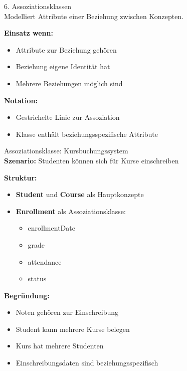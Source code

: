 \begin{concept}{6. Assoziationsklassen}\\
Modelliert Attribute einer Beziehung zwischen Konzepten.

\textbf{Einsatz wenn:}
\begin{itemize}
    \item Attribute zur Beziehung gehören
    \item Beziehung eigene Identität hat
    \item Mehrere Beziehungen möglich sind
\end{itemize}

\textbf{Notation:}
\begin{itemize}
    \item Gestrichelte Linie zur Assoziation
    \item Klasse enthält beziehungsspezifische Attribute
\end{itemize}
\end{concept}

\begin{example2}{Assoziationsklasse: Kursbuchungssystem}\\
\textbf{Szenario:} Studenten können sich für Kurse einschreiben

\textbf{Struktur:}
\begin{itemize}
    \item \textbf{Student} und \textbf{Course} als Hauptkonzepte
    \item \textbf{Enrollment} als Assoziationsklasse:
    \begin{itemize}
        \item enrollmentDate
        \item grade
        \item attendance
        \item status
    \end{itemize}
\end{itemize}

\textbf{Begründung:}
\begin{itemize}
    \item Noten gehören zur Einschreibung
    \item Student kann mehrere Kurse belegen
    \item Kurs hat mehrere Studenten
    \item Einschreibungsdaten sind beziehungsspezifisch
\end{itemize}
\end{example2}

